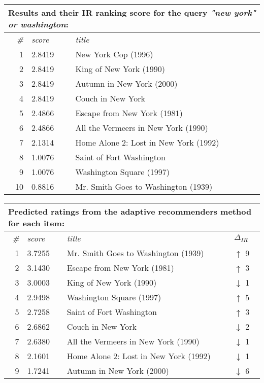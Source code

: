 \begin{table}[h]
  \centering 

  \begin{tabular*}{0.9\textwidth}{ r l p{8cm} }
    \multicolumn{3}{l}{Results and their IR ranking score for the query \emph{"new york" or washington}:}\\
    \toprule
    \emph{\#} & \emph{score} & \emph{title}\\
    \midrule
    1 & 2.8419  &  New York Cop (1996)                    \\
    2 & 2.8419  &  King of New York (1990)                \\
    3 & 2.8419  &  Autumn in New York (2000)              \\
    4 & 2.8419  &  Couch in New York                      \\
    5 & 2.4866  &  Escape from New York (1981)            \\
    6 & 2.4866  &  All the Vermeers in New York (1990)    \\
    7 & 2.1314  &  Home Alone 2: Lost in New York (1992)  \\
    8 & 1.0076  &  Saint of Fort Washington               \\
    9 & 1.0076  &  Washington Square (1997)               \\
    10& 0.8816  &  Mr. Smith Goes to Washington (1939)    \\
    \bottomrule
  \end{tabular*}

  \vspace{1em} 

  \begin{tabular*}{0.9\textwidth}{ r l p{8.5cm} l }
    \multicolumn{4}{l}{Predicted ratings from the adaptive recommenders method for each item:}\\
    \toprule
    \emph{\#} & \emph{score} & \emph{title} & $\Delta_{IR}$\\
    \midrule
    1 & 3.7255  &  Mr. Smith Goes to Washington (1939)    & \color{green} $\uparrow$ 9 \\
    2 & 3.1430  &  Escape from New York (1981)            & \color{green} $\uparrow$ 3 \\
    3 & 3.0003  &  King of New York (1990)                & \color{red} $\downarrow$ 1 \\
    4 & 2.9498  &  Washington Square (1997)               & \color{green} $\uparrow$ 5 \\
    5 & 2.7258  &  Saint of Fort Washington               & \color{green} $\uparrow$ 3 \\
    6 & 2.6862  &  Couch in New York                      & \color{red} $\downarrow$ 2 \\
    7 & 2.6380  &  All the Vermeers in New York (1990)    & \color{red} $\downarrow$ 1 \\
    8 & 2.1601  &  Home Alone 2: Lost in New York (1992)  & \color{red} $\downarrow$ 1 \\
    9 & 1.7241  &  Autumn in New York (2000)              & \color{red} $\downarrow$ 6 \\
    \bottomrule
  \end{tabular*}


\end{table}
